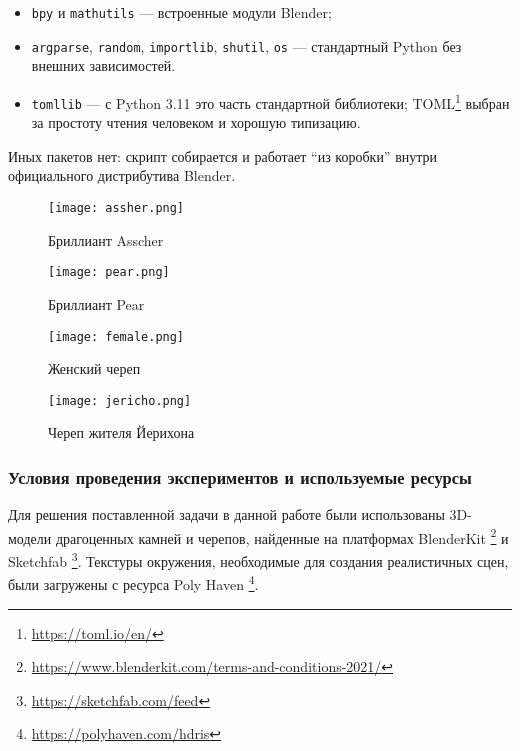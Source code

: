 \begin{itemize}
    \item \texttt{bpy} и \texttt{mathutils} — встроенные модули Blender;
    \item \texttt{argparse}, \texttt{random}, \texttt{importlib},
    \texttt{shutil}, \texttt{os} — стандартный Python без внешних зависимостей.
    \item \texttt{tomllib} — с Python 3.11 это часть стандартной библиотеки;
    TOML\footnote{\url{https://toml.io/en/}} выбран за простоту чтения человеком
    и хорошую типизацию.
\end{itemize}

Иных пакетов нет: скрипт собирается и работает ``из коробки'' внутри
официального дистрибутива Blender.

\begin{figure}[t]
\begin{minipage}{0.5\linewidth}
	\centering
	\texttt{[image: assher.png]}
	\caption{Бриллиант Asscher}
\end{minipage}%
\begin{minipage}{0.5\linewidth}
	\centering
	\texttt{[image: pear.png]}
	\caption{Бриллиант Pear}
\end{minipage}

\vspace{0.4cm}

\begin{minipage}{0.5\linewidth}
	\centering
	\texttt{[image: female.png]}
	\caption{Женский череп}
\end{minipage}%
\begin{minipage}{0.5\linewidth}
	\centering
	\texttt{[image: jericho.png]}
	\caption{Череп жителя Йерихона}
\end{minipage}
\end{figure}

\subsubsection*{Условия проведения экспериментов и используемые ресурсы}

Для решения поставленной задачи в данной работе были использованы 3D-модели
драгоценных камней и черепов, найденные на платформах BlenderKit
\footnote{\url{https://www.blenderkit.com/terms-and-conditions-2021/}} и Sketchfab
\footnote{\url{https://sketchfab.com/feed}}. Текстуры окружения, необходимые для создания
реалистичных сцен, были загружены с ресурса Poly Haven
\footnote{\url{https://polyhaven.com/hdris}}.

